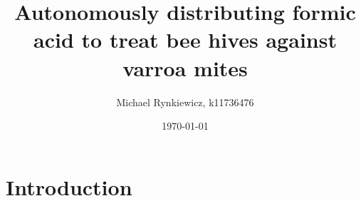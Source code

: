 \documentclass[11pt]{article}
\title{Autonomously distributing formic acid \linebreak to treat bee hives against varroa mites }
\author{Michael Rynkiewicz, k11736476}
\date{\today}
\begin{document}
   \maketitle 
    
    \begin{abstract}
        \lipsum[1]
    \end{abstract}

\newpage

    \section{Introduction}\label{sec:introduction}

    

\end{document}
